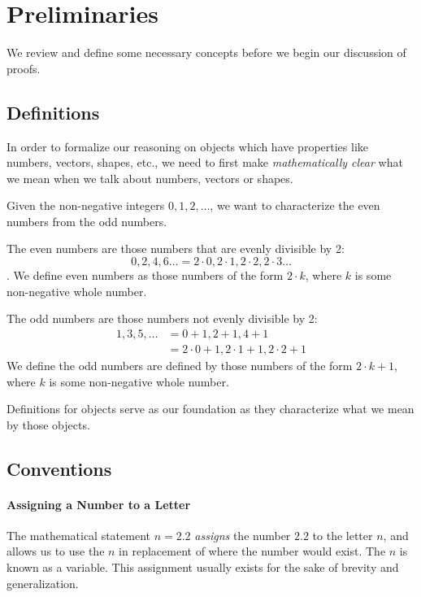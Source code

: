 \documentclass[../proofs.tex]{subfiles}
\begin{document}
\chapter{Preliminaries}
We review and define some necessary concepts before we begin our discussion of
proofs.

\section{Definitions}
In order to formalize our reasoning on objects which have properties like
numbers, vectors, shapes, etc., we need to first make \emph{mathematically
clear} what we mean when we talk about numbers, vectors or shapes.

\begin{expl}
  Given the non-negative integers $0, 1, 2, \ldots$, we want to characterize
  the even numbers from the odd numbers.

  The even numbers are those numbers that are evenly divisible by 2:
  $$0, 2, 4, 6 \ldots = 2 \cdot 0, 2 \cdot 1, 2 \cdot 2, 2 \cdot 3 \ldots$$.
  We define even numbers as those numbers of the form $2 \cdot k$, where $k$
  is some non-negative whole number.


  The odd numbers are those numbers not evenly divisible by 2:
  \begin{align*}
    1, 3, 5, \ldots &= 0 + 1, 2 + 1, 4 + 1 \\
                    &= 2 \cdot 0 + 1, 2 \cdot 1 + 1, 2 \cdot 2 + 1
  \end{align*}
  We define the odd numbers are defined by those numbers of the form
  $2 \cdot k + 1$, where $k$ is some non-negative whole number.
\end{expl}

 Definitions for objects serve as our foundation as they characterize what we
 mean by those objects.


\section{Conventions}
  \subsubsection{Assigning a Number to a Letter}
  The mathematical statement $n = 2.2$ \emph{assigns} the number $2.2$ to the
  letter $n$, and allows us to use the $n$ in replacement of where the number
  would exist. The $n$ is known as a variable. This assignment usually exists
  for the sake of brevity and generalization.
\end{document}
